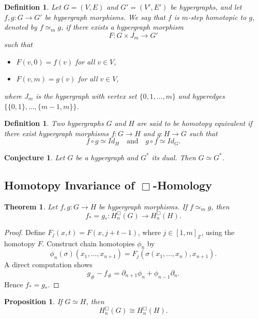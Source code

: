 \documentclass[10pt,a4paper]{amsart}
\newtheorem{thm}{Theorem}[section]
\newtheorem{Def}[subsection]{Definition}
\newtheorem{Con}[subsection]{Conjecture}
\newtheorem{prop}[subsection]{Proposition}
\begin{document}
\begin{Def}
Let $G=(V,E)$ and $G'=(V',E')$ be hypergraphs, and let $f,g:G\rightarrow G'$ be hypergraph morphisms. We say that $f$ is \emph{$m$-step homotopic} to $g$, denoted by $f\simeq_m g$, if there exists a hypergraph morphism
\[
F:G\times J_m \rightarrow G'
\]
such that
\begin{itemize}
	\item $F(v,0)=f(v)$ for all $v\in V$,
	\item $F(v,m)=g(v)$ for all $v\in V$,
\end{itemize}
where $J_m$ is the hypergraph with vertex set $\{0,1,\ldots,m\}$ and hyperedges $\{\{0,1\},\ldots,\{m-1,m\}\}$.
\end{Def}

\begin{Def}
Two hypergraphs $G$ and $H$ are said to be \emph{homotopy equivalent} if there exist hypergraph morphisms $f:G\rightarrow H$ and $g:H\rightarrow G$ such that
\[
f\circ g \simeq Id_H \quad \text{and} \quad g\circ f \simeq Id_G.
\]
\end{Def}

\begin{Con}\label{dual HE}
	Let $G$ be a hypergraph and $G^*$ its dual. Then $G\simeq G^*$.
\end{Con}

\subsection{Homotopy Invariance of $\Box$-Homology}

\begin{thm}\label{thm 2}
Let $f,g:G\rightarrow H$ be hypergraph morphisms. If $f\simeq_m g$, then
\[
f_*= g_*:H_n^\Box(G)\rightarrow H_n^\Box(H).
\]
\end{thm}

\begin{proof}
	Define $F_j(x,t)=F(x,j+t-1)$, where $j\in [1,m]_{\mathbb{Z}}$, using the homotopy $F$. Construct chain homotopies $\phi_n$ by
	\[
	\phi_n(\sigma)(x_1,\ldots,x_{n+1})=F_j(\sigma(x_1,\ldots,x_n),x_{n+1}).
	\]
	A direct computation shows
	\[
	g_{\#}-f_{\#}=\partial_{n+1}\phi_n+\phi_{n-1}\partial_n.
	\]
	Hence $f_*=g_*$.
\end{proof}

\begin{prop}\label{homotopy equivalent}
	If $G\simeq H$, then
	\[
	H_n^\Box(G)\cong H_n^\Box(H).
	\]
\end{prop}
\end{document}
